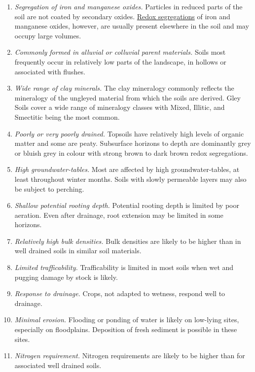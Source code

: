 \documentclass[
  letterpaper,
  DIV=11,
  numbers=noendperiod]{scrreprt}
\providecommand{\tightlist}{%
  \setlength{\itemsep}{0pt}\setlength{\parskip}{0pt}}\usepackage{longtable,booktabs,array}
\begin{document}
\begin{enumerate}
\def\labelenumi{\arabic{enumi}.}
\tightlist
\item
  \emph{Segregation of iron and manganese oxides.} Particles in reduced
  parts of the soil are not coated by secondary oxides.
  \protect\hyperlink{sec-diag-rsegs}{Redox segregations} of iron and
  manganese oxides, however, are usually present elsewhere in the soil
  and may occupy large volumes.
\item
  \emph{Commonly formed in alluvial or colluvial parent materials.}
  Soils most frequently occur in relatively low parts of the landscape,
  in hollows or associated with flushes.
\item
  \emph{Wide range of clay minerals.} The clay mineralogy commonly
  reflects the mineralogy of the ungleyed material from which the soils
  are derived. Gley Soils cover a wide range of mineralogy classes with
  Mixed, Illitic, and Smectitic being the most common.
\item
  \emph{Poorly or very poorly drained.} Topsoils have relatively high
  levels of organic matter and some are peaty. Subsurface horizons to
  depth are dominantly grey or bluish grey in colour with strong brown
  to dark brown redox segregations.
\item
  \emph{High groundwater-tables.} Most are affected by high
  groundwater-tables, at least throughout winter months. Soils with
  slowly permeable layers may also be subject to perching.
\item
  \emph{Shallow potential rooting depth.} Potential rooting depth is
  limited by poor aeration. Even after drainage, root extension may be
  limited in some horizons.
\item
  \emph{Relatively high bulk densities.} Bulk densities are likely to be
  higher than in well drained soils in similar soil materials.
\item
  \emph{Limited trafficability.} Trafficability is limited in most soils
  when wet and pugging damage by stock is likely.
\item
  \emph{Response to drainage.} Crops, not adapted to wetness, respond
  well to drainage.
\item
  \emph{Minimal erosion.} Flooding or ponding of water is likely on
  low-lying sites, especially on floodplains. Deposition of fresh
  sediment is possible in these sites.
\item
  \emph{Nitrogen requirement.} Nitrogen requirements are likely to be
  higher than for associated well drained soils.
\end{enumerate}
\end{document}
